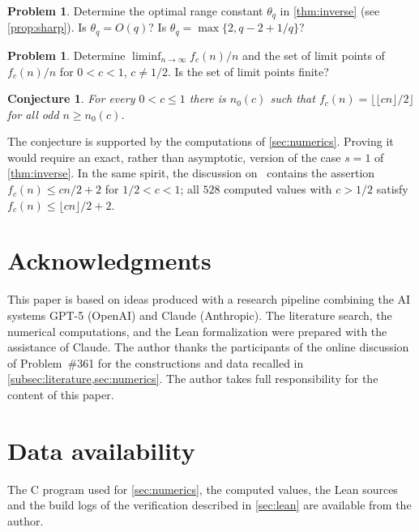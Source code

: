 \documentclass[11pt,reqno]{amsart}
\numberwithin{equation}{section}
\newtheorem{conjecture}[theorem]{Conjecture}
\theoremstyle{definition}
\newtheorem{problem}[theorem]{Problem}
\theoremstyle{remark}
\newcommand{\floor}[1]{\lfloor #1\rfloor}
\begin{document}
\begin{problem}\label{prob:threshold}
Determine the optimal range constant $\theta_q$ in \cref{thm:inverse} (see \cref{prop:sharp}). Is $\theta_q=O(q)$? Is $\theta_q=\max\{2,q-2+1/q\}$?
\end{problem}

\begin{problem}
Determine $\liminf_{n\to\infty}f_c(n)/n$ and the set of limit points of $f_c(n)/n$ for $0<c<1$, $c\ne1/2$. Is the set of limit points finite?
\end{problem}

\begin{conjecture}
For every $0<c\le1$ there is $n_0(c)$ such that $f_c(n)=\floor{\floor{cn}/2}$ for all odd $n\ge n_0(c)$.
\end{conjecture}

The conjecture is supported by the computations of \cref{sec:numerics}. Proving it would require an exact, rather than asymptotic, version of the case $s=1$ of \cref{thm:inverse}. In the same spirit, the discussion on~\cite{Bl} contains the assertion $f_c(n)\le cn/2+2$ for $1/2<c<1$; all $528$ computed values with $c>1/2$ satisfy $f_c(n)\le\floor{cn}/2+2$.

\section*{Acknowledgments}
This paper is based on ideas produced with a research pipeline combining the AI systems GPT-5 (OpenAI) and Claude (Anthropic). The literature search, the numerical computations, and the Lean formalization were prepared with the assistance of Claude. The author thanks the participants of the online discussion of Problem~\#361 for the constructions and data recalled in \cref{subsec:literature,sec:numerics}. The author takes full responsibility for the content of this paper. 

\section*{Data availability}
The C program used for \cref{sec:numerics}, the computed values, the Lean sources and the build logs of the verification described in \cref{sec:lean} are available from the author.
\end{document}
